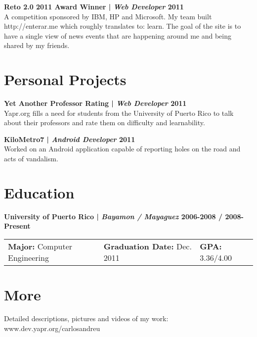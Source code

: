 \documentclass[margin,line]{res}
\begin{document}
\begin{resume}
{\bf Reto 2.0 2011 Award Winner | {\em Web Developer} \hfill {\bf 2011 \\} }
\vspace{-.01cm}
A competition sponsored by IBM, HP and Microsoft. My team built http://enterar.me which roughly translates to: learn. The goal of the site is to have a single view of news events that are happening around me and being shared by my friends. 

\section{\sc Personal Projects}

{\bf Yet Another Professor Rating | {\em Web Developer} \hfill {\bf 2011 \\} }
\vspace{-.01cm}
Yapr.org fills a need for students from the University of Puerto Rico to talk about their professors and rate them on difficulty and learnability.

{\bf KiloMetro7 | {\em Android Developer} \hfill {\bf 2011 \\} }
\vspace{-.01cm}
Worked on an Android application capable of reporting holes on the road and acts of vandalism.


\section{\sc Education}

{\bf University of Puerto Rico | {\em Bayamon / Mayaguez} \hfill {\bf 2006-2008 / 2008-Present } }
\vspace{-.01cm}
\begin{tabular}{@{}p{2in}p{2in}p{2in}}
 {\bf Major:} Computer Engineering           & {\bf Graduation Date:} Dec. 2011  & {\bf GPA:} 3.36/4.00  \\            
\end{tabular}


\section{\sc More}
Detailed descriptions, pictures and videos of my work: www.dev.yapr.org/carlosandreu    \\

\end{resume}
\end{document}
